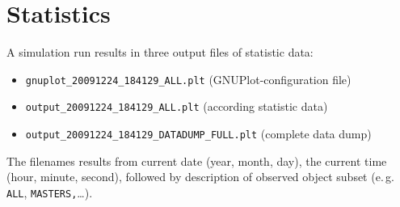 \section{Statistics}
A simulation run results in three output files of statistic data:

\begin{itemize}
\item \texttt{gnuplot\_20091224\_184129\_ALL.plt} (GNUPlot-configuration file)
\item \texttt{output\_20091224\_184129\_ALL.plt} (according statistic data)
\item \texttt{output\_20091224\_184129\_DATADUMP\_FULL.plt} (complete data dump)
\end{itemize}

The filenames results from current date (year, month, day), the current time (hour, minute, second), followed by description of observed object subset (e.\,g. \texttt{ALL}, \linebreak \texttt{MASTERS,}\dots).
